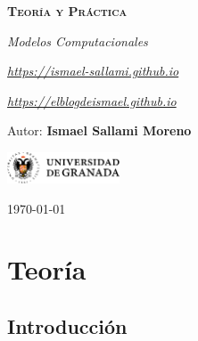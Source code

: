 \documentclass[12pt]{report} %
\begin{document}
\begin{titlepage}
    \begin{center}
        \vspace*{2cm}
        
        {\Huge \bfseries\scshape Teoría y Práctica \par}
        \vspace{0.5cm}
        {\Large \itshape Modelos Computacionales \par}
        \vspace{0.5cm}
        {\small \itshape \href{https://ismael-sallami.github.io}{https://ismael-sallami.github.io} \par}
        {\small \itshape \href{https://elblogdeismael.github.io}{https://elblogdeismael.github.io} \par}


        \vfill
        
        {\LARGE Autor: \textbf{Ismael Sallami Moreno} \par}
        \vspace{0.3cm}
        
        \vspace{1cm}
        \includegraphics[width=0.25\textwidth]{../../../extraFiles/img/ugr.png} %
        \vspace{1cm}
        
        {\large \today}
    \end{center}
    
    \restoregeometry
\end{titlepage}


\thispagestyle{empty} %
\clearpage

\tableofcontents
\thispagestyle{empty} %
\clearpage

\part{Teoría}

\hypertarget{introducciuxf3n}{%
\chapter{Introducción}\label{introducciuxf3n}}
\end{document}
